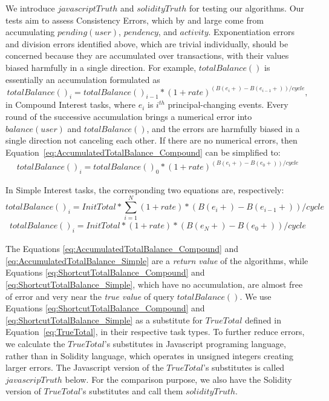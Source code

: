 \documentclass{article}
\begin{document}
We introduce $javascriptTruth$ and $solidityTruth$ for testing our algorithms.
Our tests aim to assess Consistency Errors, which by and large come from 
accumulating $pending(user)$, $pendency$, and $activity$. Exponentiation errors 
and division errors identified above, which are trivial individually, 
should be concerned because they are accumulated over transactions, 
with their values biased harmfully in a single direction.
For example, $totalBalance()$ is essentially an accumulation formulated as 
\begin{equation} \label{eq:AccumulatedTotalBalance_Compound}
  totalBalance()_{i} = totalBalance()_{i-1} * (1+rate)^{(B(e_{i}+)-B(e_{i-1}+))/cycle},
\end{equation}
in Compound Interest tasks, where $e_{i}$ is $i^{th}$ principal-changing events.
Every round of the successive accumulation brings a numerical error into $balance(user)$ 
and $totalBalance()$, and the errors are harmfully biased in a single direction 
not canceling each other.
If there are no numerical errors, then Equation~\ref{eq:AccumulatedTotalBalance_Compound} 
can be simplified to:
\begin{equation} \label{eq:ShortcutTotalBalance_Compound}
  \begin{split}
  totalBalance()_{i} = totalBalance()_{0} * (1+rate)^{(B(e_{i}+)-B(e_{0}+))/cycle}
  \end{split}
\end{equation}

In Simple Interest tasks, the corresponding two equations are, respectively:
\begin{equation} \label{eq:AccumulatedTotalBalance_Simple}
  totalBalance()_{i} = InitTotal * \sum_{i=1}^{N} (1+rate) * (B(e_{i}+)-B(e_{i-1}+))/cycle
\end{equation}
\begin{equation} \label{eq:ShortcutTotalBalance_Simple}
  \begin{split}
  totalBalance()_{i} = InitTotal * (1+rate) * {(B(e_{N}+)-B(e_{0}+))/cycle}
  \end{split}
\end{equation}

The Equations \ref{eq:AccumulatedTotalBalance_Compound} and \ref{eq:AccumulatedTotalBalance_Simple} 
are a \textit{return value} of the algorithms, while Equations
\ref{eq:ShortcutTotalBalance_Compound} and \ref{eq:ShortcutTotalBalance_Simple}, 
which have no accumulation, 
are almost free of error and very near the \textit{true value} of query $totalBalance()$.
We use Equations
\ref{eq:ShortcutTotalBalance_Compound} and \ref{eq:ShortcutTotalBalance_Simple} 
as a substitute for $TrueTotal$ defined in 
Equation~\ref{eq:TrueTotal}, in their respective task types.
To further reduce errors, we calculate the $TrueTotal$'s substitutes in Javascript 
programing language, rather than in Solidity language, which operates in unsigned integers 
creating larger errors. 
The Javascript version of the $TrueTotal$'s substitutes is called 
$javascripTruth$ below. For the comparison purpose, we also have the Solidity version of 
$TrueTotal$'s substitutes and call them $solidityTruth$.
\newline
\end{document}
